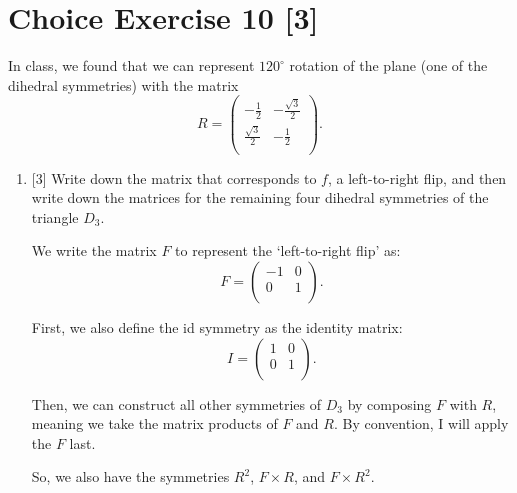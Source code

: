 \documentclass{article}
\begin{document}
\pagebreak
\section*{Choice Exercise 10 [3]}

In class, we found that we can represent \(120^\circ\) rotation of the plane (one of the dihedral symmetries) with the matrix \[ R = \begin{pmatrix}   -\frac{1}{2} & -\frac{\sqrt{3}}{2} \\   \frac{\sqrt{3}}{2} & -\frac{1}{2} \\ \end{pmatrix}. \]
\begin{enumerate}
    \item {
        [3] Write down the matrix that corresponds to \(f\), a left-to-right flip, and then write down the matrices for the remaining four dihedral symmetries of the triangle \(D_3\).

        We write the matrix \(F\) to represent the `left-to-right flip' as:
        \[ 
            F = 
            \begin{pmatrix}   
                -1 & 0 \\   
                0 & 1 \\ 
            \end{pmatrix}. 
        \]

        First, we also define the id symmetry as the identity matrix:
        \[
            I =
            \begin{pmatrix}
                1 & 0 \\   
                0 & 1 \\ 
            \end{pmatrix}.
        \]

        Then, we can construct all other symmetries of \(D_3\) by composing 
        \(F\) with \(R\), meaning we take the matrix products of \(F\) and \(R\).
        By convention, I will apply the \(F\) last.

        So, we also have the symmetries \(R^2\), \(F \times R\), and \(F \times R^2\).
    }
\end{enumerate}
\end{document}
